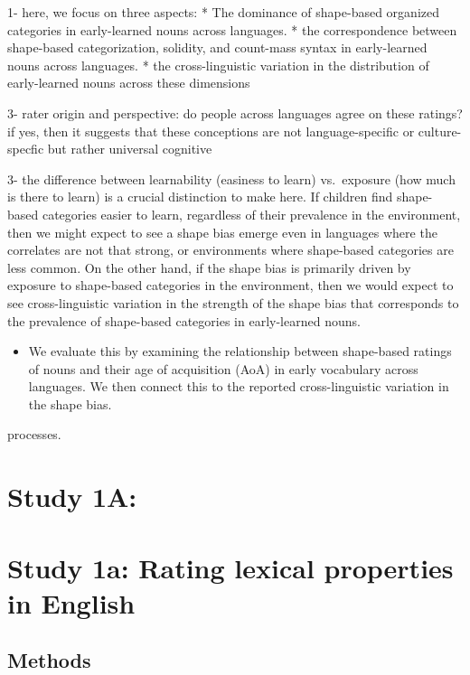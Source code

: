 \documentclass[
  american,
  man,floatsintext]{apa6}
\providecommand{\tightlist}{%
  \setlength{\itemsep}{0pt}\setlength{\parskip}{0pt}}
\begin{document}
1- here, we focus on three aspects:
* The dominance of shape-based organized categories in early-learned nouns across languages.
* the correspondence between shape-based categorization, solidity, and count-mass syntax in early-learned nouns across languages.
* the cross-linguistic variation in the distribution of early-learned nouns across these dimensions

3- rater origin and perspective: do people across languages agree on these ratings? if yes, then it suggests that these conceptions are not language-specific or culture-specfic but rather universal cognitive

3- the difference between learnability (easiness to learn) vs.~exposure (how much is there to learn) is a crucial distinction to make here. If children find shape-based categories easier to learn, regardless of their prevalence in the environment, then we might expect to see a shape bias emerge even in languages where the correlates are not that strong, or environments where shape-based categories are less common. On the other hand, if the shape bias is primarily driven by exposure to shape-based categories in the environment, then we would expect to see cross-linguistic variation in the strength of the shape bias that corresponds to the prevalence of shape-based categories in early-learned nouns.

\begin{itemize}
\tightlist
\item
  We evaluate this by examining the relationship between shape-based ratings of nouns and their age of acquisition (AoA) in early vocabulary across languages. We then connect this to the reported cross-linguistic variation in the shape bias.
\end{itemize}

processes.

\section{Study 1A:}\label{study-1a}

\section{Study 1a: Rating lexical properties in English}\label{study-1a-rating-lexical-properties-in-english}

\subsection{Methods}\label{methods}
\end{document}
